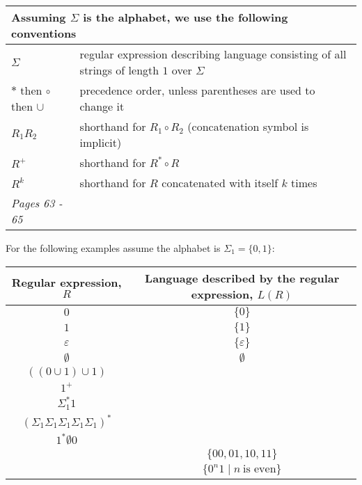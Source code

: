     
    \begin{center}
    \begin{tabular}{|ll|}
    \hline
    \multicolumn{2}{|l|}{Assuming $\Sigma$ is the alphabet, we use the following conventions}\\
    \hline
    $\Sigma$   & regular  expression describing language consisting of  all strings  of length  $1$ over $\Sigma$\\
    $*$ then $\circ$ then $\cup$   & precedence order, unless parentheses are used to change it\\
    $R_1R_2$ & shorthand  for  $R_1  \circ R_2$ (concatenation symbol is implicit) \\
    $R^+$ & shorthand for $R^* \circ R$ \\
    $R^k$ & shorthand for $R$ concatenated with itself $k$ times\\
    \hline
    {\it Pages 63 - 65 }& \\
    \hline
    \end{tabular}
    \end{center}
    
    
    For the following examples assume the alphabet is $\Sigma_1 =  \{0,1\}$:
    
    \begin{center}
    \renewcommand{\arraystretch}{1.5}
    \begin{tabular}{c|c}
    Regular expression, $R$ & Language described by the regular expression, $L(R)$\\
    \hline
    $0$ &$ \{ 0 \}$ \\
    $1$ & $\{ 1 \}$ \\
    $\varepsilon$ & $\{ \varepsilon  \}$ \\
    $\emptyset$ & $\emptyset$ \\
    $((0 \cup 1) \cup 1)$ & \\
    $1^+$ & \\
    $\Sigma_1^* 1$ & \\
    $(\Sigma_1 \Sigma_1 \Sigma_1 \Sigma_1 \Sigma_1)^*$ & \\
    $1^* \emptyset 0$ & \\
    & $\{00, 01, 10, 11\}$  \\
    & $\{ 0^n1 \mid n~\text{is even} \}$
    \end{tabular}
    \end{center}